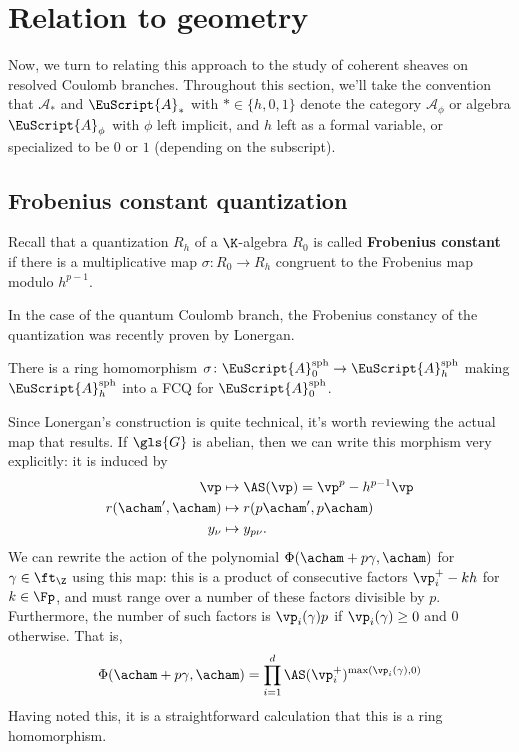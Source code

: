 \section{Relation to geometry}
\label{sec:geometry}
Now, we turn to relating this approach to the study of coherent
sheaves on resolved Coulomb branches.   Throughout this section, we'll
take the convention that $\mathscr{A}_*$
and $\EuScript{A}_*$ with $*\in \{h,0,1\}$ denote the category $\mathscr{A}_\phi$ or algebra
$\EuScript{A}_\phi$ with $\phi$ left implicit, and $h$ left as a formal variable, or specialized to
be $0$ or $1$ (depending on the subscript).  

\subsection{Frobenius constant quantization}

Recall that a quantization $R_h$ of a $\K$-algebra $R_0$ is called {\bf Frobenius
  constant} if there is a multiplicative map $\sigma\colon
R_0\to R_h$ congruent to the Frobenius map
modulo $h^{p-1}$.  

In the case of the quantum Coulomb branch, the Frobenius constancy of the quantization was recently proven by Lonergan.
\begin{theorem}
  There is a ring homomorphism $\sigma\colon \EuScript{A}_0^{\operatorname{sph}}\to  \EuScript{A}_h^{\operatorname{sph}}$
  making $\EuScript{A}_h^{\operatorname{sph}}$ into a FCQ for $\EuScript{A}_0^{\operatorname{sph}}$.
\end{theorem}
Since Lonergan's construction is quite technical, it's worth reviewing the actual map that results.    If $\gls{G}$ is abelian, then we can write this morphism very explicitly:
  it is induced by 
\begin{align}
    \vp &\mapsto \AS(\vp)=\vp^p-h^{p-1}\vp\\
    r(\acham',\acham)&\mapsto r(p\acham',p\acham)\\
    y_{\nu}&\mapsto y_{p\nu}.
\end{align} 
We can rewrite the action of the polynomial
$\Phi(\acham+p\gamma,\acham)$ for $\gamma\in \ft_{\Z}$ using this map:
this is a product of consecutive factors $\vp_i^+-kh$ for $k\in \Fp$,
and must range over a number of these factors divisible by $p$.
Furthermore, the number of such factors is $\vp_i(\gamma)p$ if
$\vp_i(\gamma)\geq 0$ and $0$ otherwise.  That
is,
\[\Phi(\acham+p\gamma,\acham)=\prod_{i=1}^d
\AS(\vp^+_i)^{\operatorname{max}(\vp_i(\gamma),0)}\]
Having noted this, it is a
straightforward calculation that this is a ring homomorphism.

